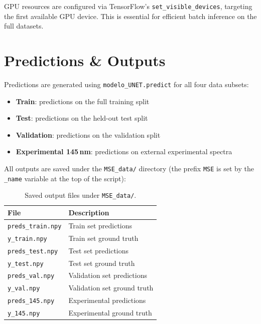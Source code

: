 \documentclass[11pt,a4paper]{article}
\begin{document}
GPU resources are configured via TensorFlow's \texttt{set\_visible\_devices}, targeting the first available GPU device. This is essential for efficient batch inference on the full datasets.

\section{Predictions \& Outputs}

Predictions are generated using \texttt{modelo\_UNET.predict} for all four data subsets:

\begin{itemize}
    \item \textbf{Train}: predictions on the full training split
    \item \textbf{Test}: predictions on the held-out test split
    \item \textbf{Validation}: predictions on the validation split
    \item \textbf{Experimental 145\,nm}: predictions on external experimental spectra
\end{itemize}

All outputs are saved under the \texttt{MSE\_data/} directory (the prefix \texttt{MSE} is set by the \texttt{\_name} variable at the top of the script):

\begin{table}[h]
\centering
\begin{tabular}{ll}
\toprule
\textbf{File} & \textbf{Description} \\
\midrule
\texttt{preds\_train.npy} & Train set predictions \\
\texttt{y\_train.npy}     & Train set ground truth \\
\texttt{preds\_test.npy}  & Test set predictions \\
\texttt{y\_test.npy}      & Test set ground truth \\
\texttt{preds\_val.npy}   & Validation set predictions \\
\texttt{y\_val.npy}       & Validation set ground truth \\
\texttt{preds\_145.npy}   & Experimental predictions \\
\texttt{y\_145.npy}       & Experimental ground truth \\
\bottomrule
\end{tabular}
\caption{Saved output files under \texttt{MSE\_data/}.}
\label{tab:outputs}
\end{table}
\end{document}
